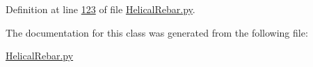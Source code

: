 Definition at line \hyperlink{HelicalRebar_8py_source_l00123}{123} of file \hyperlink{HelicalRebar_8py_source}{Helical\+Rebar.\+py}.



The documentation for this class was generated from the following file\+:\begin{DoxyCompactItemize}
\item 
\hyperlink{HelicalRebar_8py}{Helical\+Rebar.\+py}\end{DoxyCompactItemize}
